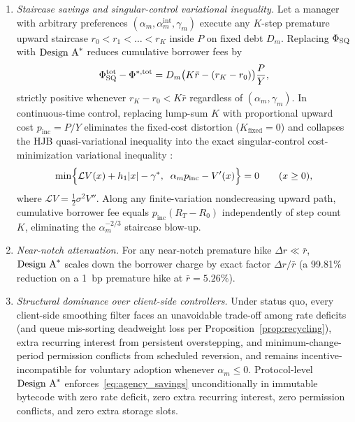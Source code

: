 \begin{theorem}\label{thm:agency_astar}
\begin{enumerate}[label=(\roman*), leftmargin=2.2em, itemsep=2pt]
\item \emph{Staircase savings and singular-control variational inequality.} Let a manager with arbitrary preferences $(\alpha_m, \alpha_m^{\mathrm{int}}, \gamma_m)$ execute any $K$-step premature upward staircase $r_0 < r_1 < \dots < r_K$ inside $P$ on fixed debt $D_m$. Replacing $\Phi_{\mathrm{SQ}}$ with $\textup{Design A}^*$ reduces cumulative borrower fees by
\begin{equation}\label{eq:agency_savings}
\Phi_{\mathrm{SQ}}^{\mathrm{tot}} - \Phi^{*,\mathrm{tot}} = D_m\bigl(K\bar{r} - (r_K - r_0)\bigr)\frac{P}{Y},
\end{equation}
strictly positive whenever $r_K - r_0 < K\bar{r}$ regardless of $(\alpha_m, \gamma_m)$. In continuous-time control, replacing lump-sum $K$ with proportional upward cost $p_{\mathrm{inc}} = P/Y$ eliminates the fixed-cost distortion ($K_{\mathrm{fixed}} = 0$) and collapses the HJB quasi-variational inequality into the exact singular-control cost-minimization variational inequality \citep{harrison1983instantaneous}:
\begin{equation}\label{eq:singular_vi}
\min\Bigl\{\mathcal{L}V(x) + h_1|x| - \gamma^*,\;\; \alpha_m p_{\mathrm{inc}} - V'(x)\Bigr\} = 0 \qquad (x \ge 0),
\end{equation}
where $\mathcal{L}V = \frac{1}{2}\sigma^2 V''$. Along any finite-variation nondecreasing upward path, cumulative borrower fee equals $p_{\mathrm{inc}}(R_T - R_0)$ independently of step count $K$, eliminating the $\alpha_m^{-2/3}$ staircase blow-up.
\item \emph{Near-notch attenuation.} For any near-notch premature hike $\Delta r \ll \bar{r}$, $\textup{Design A}^*$ scales down the borrower charge by exact factor $\Delta r/\bar{r}$ (a 99.81\% reduction on a 1~bp premature hike at $\bar{r} = 5.26\%$).
\item \emph{Structural dominance over client-side controllers.} Under status quo, every client-side smoothing filter faces an unavoidable trade-off among rate deficits (and queue mis-sorting deadweight loss per Proposition~\ref{prop:recycling}), extra recurring interest from persistent overstepping, and minimum-change-period permission conflicts from scheduled reversion, and remains incentive-incompatible for voluntary adoption whenever $\alpha_m \le 0$. Protocol-level $\textup{Design A}^*$ enforces~\eqref{eq:agency_savings} unconditionally in immutable bytecode with zero rate deficit, zero extra recurring interest, zero permission conflicts, and zero extra storage slots.
\end{enumerate}
\end{theorem}

